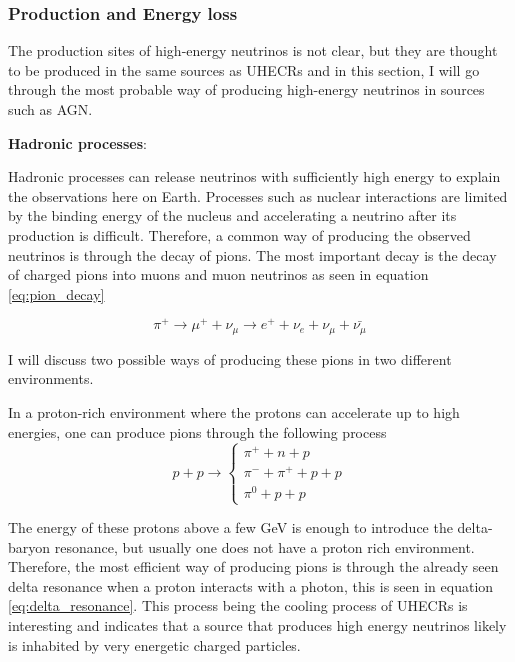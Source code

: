 \subsubsection{Production and Energy loss}
The production sites of high-energy neutrinos is not clear, but they are thought to be produced in the same sources as UHECRs 
and in this section, I will go through the most probable way of producing high-energy neutrinos in sources such as AGN.

\textbf{Hadronic processes}:

Hadronic processes can release neutrinos with sufficiently high energy to explain the observations here on Earth. 
Processes such as nuclear interactions are limited by the binding energy of the nucleus and accelerating a neutrino after its production is difficult.
Therefore, a common way of producing the observed neutrinos is through the decay of pions. The most important decay is the decay of charged pions into muons and muon neutrinos as seen in equation \ref{eq:pion_decay}


\begin{equation}
    \pi^+ \rightarrow \mu^+ + \nu_\mu \rightarrow e^+ + \nu_e + \nu_\mu + \bar{\nu_\mu}
    \label{eq:pion_decay}
\end{equation}

I will discuss two possible ways of producing these pions in two different environments. 


In a proton-rich environment where the protons can accelerate up to high energies, one can produce pions through the following process
\begin{equation}
    p + p \rightarrow \begin{cases}
        \pi^+ + n+ p \\
        \pi^- + \pi^+ +p + p  \\
        \pi^0 + p+p
    \end{cases}
\end{equation}

The energy of these protons above a few GeV is enough to introduce the delta-baryon resonance, but usually one does not have a proton rich environment.
Therefore, the most efficient way of producing pions is through the already seen delta resonance when a proton interacts with a photon, this is seen in equation \ref{eq:delta_resonance}.
This process being the cooling process of UHECRs is interesting and indicates that a source that produces high energy neutrinos likely is inhabited by very energetic charged particles. 

